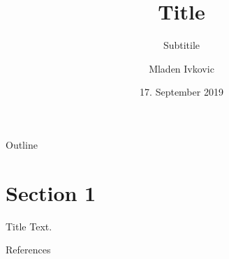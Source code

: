 





\title[shortform]{Title}
\subtitle[shortform-subtitle]{Subtitile}
\author[M. Ivkovic]{Mladen Ivkovic}
\date[17.09.19]{17. September 2019}













\begin{frame}{}
	\titlepage
\end{frame}


\begin{frame}{Outline}\label{tableofcontents}
   \tableofcontents
\end{frame}

\section{Section 1}
\begin{frame}{Title}
    Text.
\end{frame}


\begin{frame}{}
    
\end{frame}


\begin{frame}{}
    
\end{frame}


\begin{frame}{}
    
\end{frame}


\begin{frame}{References}
    \cite{AHF}
    
    \parencite{AMR}
    
    \renewcommand*{\bibfont}{\footnotesize}
    \printbibliography[]    
\end{frame}







